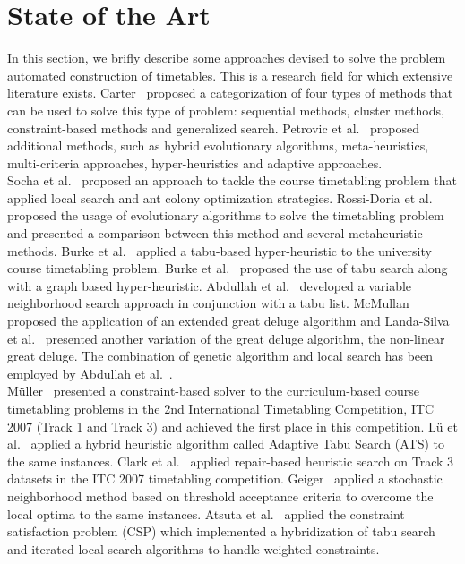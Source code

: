 \section{State of the Art}
In this section, we brifly describe some approaches devised to solve the problem automated construction of timetables. This is a research field for which extensive literature exists. Carter~\cite{Carter1986} proposed a categorization of four types of methods that can be used to solve this type of problem: sequential methods, cluster methods, constraint-based methods and generalized search. Petrovic et al.~\cite{Petrovic2004} proposed additional methods, such as hybrid evolutionary algorithms, meta-heuristics, multi-criteria approaches, hyper-heuristics and adaptive approaches.\\
Socha et al.~\cite{Socha2002} proposed an approach to tackle the course timetabling problem that applied local search and ant colony optimization strategies. Rossi-Doria et al.~\cite{Rossi-Doria2003} proposed the usage of evolutionary algorithms to solve the timetabling problem and presented a comparison between this method and several metaheuristic methods.
Burke et al.~\cite{Burke2003} applied a tabu-based hyper-heuristic to the university course timetabling problem. Burke et al.~\cite{Burke2007} proposed the use of tabu search along with a graph based hyper-heuristic. Abdullah et al.~\cite{Abdullah2005} developed a variable neighborhood search approach in conjunction with a tabu list. McMullan~\cite{McMullan2007} proposed the application of an extended great deluge algorithm and Landa-Silva et al.~\cite{Landa-Silva2008} presented another variation of the great deluge algorithm, the non-linear great deluge. The combination of genetic algorithm and local search has been employed by Abdullah et al.~\cite{Abdullah2008}.\\
Müller~\cite{Mueller2007} presented a constraint-based solver to the curriculum-based course timetabling problems in the 2nd International Timetabling Competition, ITC 2007 (Track 1 and Track 3) and achieved the first place in this competition. Lü et al.~\cite{Lue2010} applied a hybrid heuristic algorithm called Adaptive Tabu Search (ATS) to the same instances. Clark et al.~\cite{Clark2008} applied repair-based heuristic search on Track 3 datasets in the ITC 2007 timetabling competition. Geiger~\cite{Geiger2008} applied a stochastic neighborhood method based on threshold acceptance criteria to overcome the local optima to the same instances. Atsuta et al.~\cite{Atsuta2007} applied the constraint satisfaction problem (CSP) which implemented a hybridization of tabu search and iterated local search algorithms to handle weighted constraints.\\
